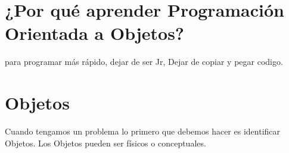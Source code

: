 \documentclass{article}
\begin{document}
    \section{¿Por qué aprender Programación Orientada a Objetos?}
    para programar más rápido, dejar de ser Jr, Dejar de copiar y pegar codigo.
    \section{Objetos}
    Cuando tengamos un problema lo primero que debemos hacer es identificar Objetos.
    Los Objetos pueden ser físicos o conceptuales.
    
\end{document}
